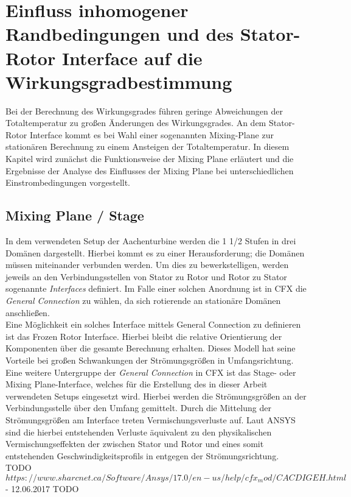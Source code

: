 \chapter{Einfluss inhomogener Randbedingungen und des Stator-Rotor Interface auf die Wirkungsgradbestimmung}
\label{cha:kanal}
Bei der Berechnung des Wirkungsgrades führen geringe Abweichungen der Totaltemperatur zu großen Änderungen des Wirkungsgrades. An dem Stator-Rotor Interface kommt es bei Wahl einer sogenannten Mixing-Plane zur stationären Berechnung zu einem Ansteigen der Totaltemperatur. In diesem Kapitel wird zunächst die Funktionsweise der Mixing Plane erläutert und die Ergebnisse der Analyse des Einflusses der Mixing Plane bei unterschiedlichen Einstrombedingungen vorgestellt.
\section{Mixing Plane / Stage}
In dem verwendeten Setup der Aachenturbine werden die 1 1/2 Stufen in drei Domänen dargestellt. Hierbei kommt es zu einer Herausforderung; die Domänen müssen miteinander verbunden werden. Um dies zu bewerkstelligen, werden jeweils an den Verbindungsstellen von Stator zu Rotor und Rotor zu Stator sogenannte \textit{Interfaces} definiert.
Im Falle einer solchen Anordnung ist in CFX die \textit{General Connection} zu wählen, da sich rotierende an stationäre Domänen anschließen.\\
Eine Möglichkeit ein solches Interface mittels General Connection zu definieren ist das Frozen Rotor Interface. Hierbei bleibt die relative Orientierung der Komponenten über die gesamte Berechnung erhalten. 
Dieses Modell hat seine Vorteile bei großen Schwankungen der Strömungsgrößen in Umfangsrichtung.\\
Eine weitere Untergruppe der \textit{General Connection} in CFX ist das Stage- oder Mixing Plane-Interface, welches für die Erstellung des in dieser Arbeit verwendeten Setups eingesetzt wird. Hierbei werden die Strömungsgrößen an der Verbindungsstelle über den Umfang gemittelt.
Durch die Mittelung der Strömungsgrößen am Interface treten Vermischungsverluste auf. Laut ANSYS sind die hierbei entstehenden Verluste äquivalent zu den physikalischen Vermischungseffekten der zwischen Stator und Rotor und eines somit entstehenden Geschwindigkeitsprofils in entgegen der Strömungsrichtung.\\
TODO ${https://www.sharcnet.ca/Software/Ansys/17.0/en-us/help/cfx_mod/CACDIGEH.html} $- 12.06.2017 TODO

